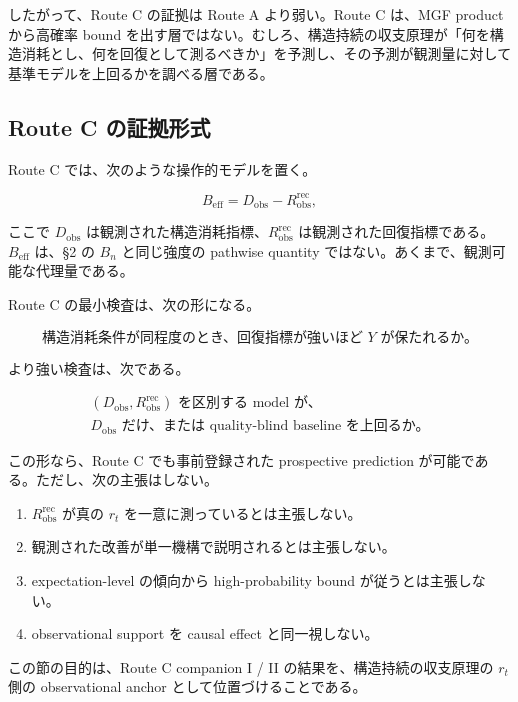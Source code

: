 \documentclass[12pt,a4paper]{article}
\begin{document}
したがって、Route C の証拠は Route A より弱い。Route C は、MGF product から高確率 bound を出す層ではない。むしろ、構造持続の収支原理が「何を構造消耗とし、何を回復として測るべきか」を予測し、その予測が観測量に対して基準モデルを上回るかを調べる層である。

\subsection{Route C の証拠形式}\label{route-c-ux306eux8a3cux62e0ux5f62ux5f0f}

Route C では、次のような操作的モデルを置く。

\[
B_{\mathrm{eff}} = D_{\mathrm{obs}} - R_{\mathrm{obs}}^{\mathrm{rec}},
\]

ここで \(D_{\mathrm{obs}}\) は観測された構造消耗指標、\(R_{\mathrm{obs}}^{\mathrm{rec}}\) は観測された回復指標である。\(B_{\mathrm{eff}}\) は、§2 の \(B_{n}\) と同じ強度の pathwise quantity ではない。あくまで、観測可能な代理量である。

Route C の最小検査は、次の形になる。

\[
\text{構造消耗条件が同程度のとき、回復指標が強いほど }Y\text{ が保たれるか。}
\]

より強い検査は、次である。

\[
\begin{aligned}
(D_{\mathrm{obs}},R_{\mathrm{obs}}^{\mathrm{rec}})\text{ を区別する model が、} \\
D_{\mathrm{obs}}\text{ だけ、または quality-blind baseline を上回るか。}
\end{aligned}
\]

この形なら、Route C でも事前登録された prospective prediction が可能である。ただし、次の主張はしない。

\begin{enumerate}
\def\labelenumi{\arabic{enumi}.}
\tightlist
\item
  \(R_{\mathrm{obs}}^{\mathrm{rec}}\) が真の \(r_{t}\) を一意に測っているとは主張しない。
\item
  観測された改善が単一機構で説明されるとは主張しない。
\item
  expectation-level の傾向から high-probability bound が従うとは主張しない。
\item
  observational support を causal effect と同一視しない。
\end{enumerate}

この節の目的は、Route C companion I / II の結果を、構造持続の収支原理の \(r_{t}\) 側の observational anchor として位置づけることである。
\end{document}
